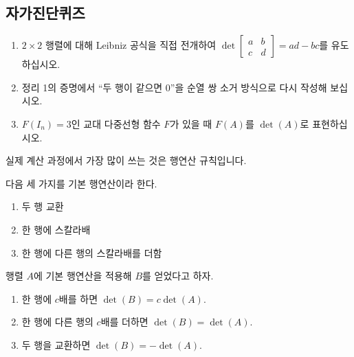 \subsection*{자가진단퀴즈}
\begin{enumerate}[label=\arabic*.]
\item $2\times2$ 행렬에 대해 Leibniz 공식을 직접 전개하여 $\det\begin{bmatrix}a&b\\c&d\end{bmatrix}=ad-bc$를 유도하십시오.
\item 정리 1의 증명에서 ``두 행이 같으면 0''을 순열 쌍 소거 방식으로 다시 작성해 보십시오.
\item $F(I_n)=3$인 교대 다중선형 함수 $F$가 있을 때 $F(A)$를 $\det(A)$로 표현하십시오.
\end{enumerate}


실제 계산 과정에서 가장 많이 쓰는 것은 행연산 규칙입니다.

\begin{definition}
다음 세 가지를 기본 행연산이라 한다.
\begin{enumerate}[label=(\roman*)]
\item 두 행 교환
\item 한 행에 스칼라배
\item 한 행에 다른 행의 스칼라배를 더함
\end{enumerate}
\end{definition}

\begin{theorem}
행렬 $A$에 기본 행연산을 적용해 $B$를 얻었다고 하자.
\begin{enumerate}[label=(\roman*)]
\item 한 행에 $c$배를 하면 $\det(B)=c\det(A)$.
\item 한 행에 다른 행의 $c$배를 더하면 $\det(B)=\det(A)$.
\item 두 행을 교환하면 $\det(B)=-\det(A)$.
\end{enumerate}
\end{theorem}

